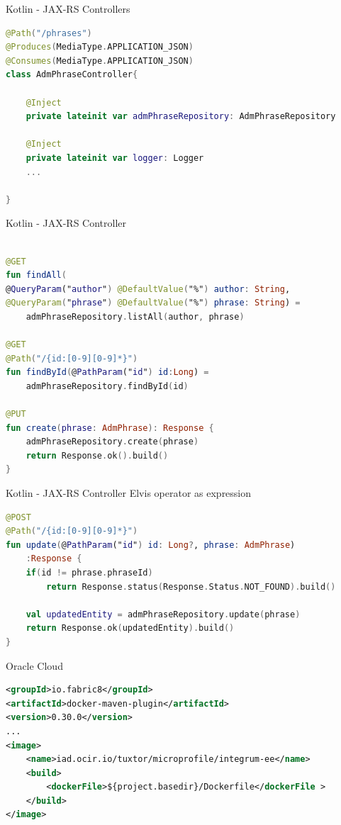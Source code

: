 \documentclass[aspectratio=169]{beamer}
\begin{document}
\begin{frame}[fragile]{Kotlin - JAX-RS Controllers}
\begin{lstlisting}[language=Kotlin, basicstyle=\scriptsize]
@Path("/phrases")
@Produces(MediaType.APPLICATION_JSON)
@Consumes(MediaType.APPLICATION_JSON)
class AdmPhraseController{

	@Inject
	private lateinit var admPhraseRepository: AdmPhraseRepository

	@Inject
	private lateinit var logger: Logger
	...

}
\end{lstlisting}
\end{frame}

\begin{frame}[fragile]{Kotlin - JAX-RS Controller}
\begin{lstlisting}[language=Kotlin, basicstyle=\scriptsize]

@GET
fun findAll(
@QueryParam("author") @DefaultValue("%") author: String,
@QueryParam("phrase") @DefaultValue("%") phrase: String) =
	admPhraseRepository.listAll(author, phrase)

@GET
@Path("/{id:[0-9][0-9]*}")
fun findById(@PathParam("id") id:Long) =
	admPhraseRepository.findById(id)

@PUT
fun create(phrase: AdmPhrase): Response {
	admPhraseRepository.create(phrase)
	return Response.ok().build()
}
\end{lstlisting}
\end{frame}


\begin{frame}[fragile]{Kotlin - JAX-RS Controller}
Elvis operator as expression
\begin{lstlisting}[language=Kotlin, basicstyle=\scriptsize]
@POST
@Path("/{id:[0-9][0-9]*}")
fun update(@PathParam("id") id: Long?, phrase: AdmPhrase)
	:Response {
	if(id != phrase.phraseId)
		return Response.status(Response.Status.NOT_FOUND).build()

	val updatedEntity = admPhraseRepository.update(phrase)
	return Response.ok(updatedEntity).build()
}

\end{lstlisting}

\end{frame}

\begin{frame}[fragile]{Oracle Cloud}
\begin{lstlisting}[language=XML, basicstyle=\scriptsize]
<groupId>io.fabric8</groupId>
<artifactId>docker-maven-plugin</artifactId>
<version>0.30.0</version>
...
<image>
	<name>iad.ocir.io/tuxtor/microprofile/integrum-ee</name>
	<build>
		<dockerFile>${project.basedir}/Dockerfile</dockerFile >
	</build>
</image>
\end{lstlisting}
\end{frame}
\end{document}
